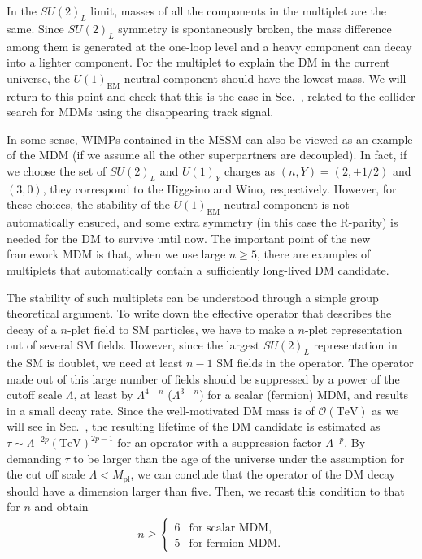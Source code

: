 \documentclass[12pt,twoside,book]{article}
\begin{document}
In the $SU(2)_L$ limit, masses of all the components in the multiplet are the same.
Since $SU(2)_L$ symmetry is spontaneously broken, the mass difference among them is generated at the one-loop level and a heavy component can decay into a lighter component.
For the multiplet to explain the DM in the current universe, the $U(1)_{\mathrm{EM}}$ neutral component should have the lowest mass.
We will return to this point and check that this is the case in Sec.~, related to the collider search for MDMs using the disappearing track signal.

In some sense, WIMPs contained in the MSSM can also be viewed as an example of the MDM (if we assume all the other superpartners are decoupled).
In fact, if we choose the set of $SU(2)_L$ and $U(1)_Y$ charges as $(n,Y) = (2,\pm 1/2)$ and $(3, 0)$, they correspond to the Higgsino and Wino, respectively.
However, for these choices, the stability of the $U(1)_{\mathrm{EM}}$ neutral component is not automatically ensured, and some extra symmetry (in this case the R-parity) is needed for the DM to survive until now.
The important point of the new framework MDM is that, when we use large $n \geq 5$, there are examples of multiplets that automatically contain a sufficiently long-lived DM candidate.

The stability of such multiplets can be understood through a simple group theoretical argument.
To write down the effective operator that describes the decay of a $n$-plet field to SM particles, we have to make a $n$-plet representation out of several SM fields.
However, since the largest $SU(2)_L$ representation in the SM is doublet, we need at least $n-1$ SM fields in the operator.
The operator made out of this large number of fields should be suppressed by a power of the cutoff scale $\Lambda$, at least by $\Lambda^{4-n}$ ($\Lambda^{3-n}$) for a scalar (fermion) MDM, and results in a small decay rate.
Since the well-motivated DM mass is of $\mathcal{O} (\mathrm{TeV})$ as we will see in Sec.~, the resulting lifetime of the DM candidate is estimated as $\tau \sim \Lambda^{-2p} (\mathrm{TeV})^{2p-1}$ for an operator with a suppression factor $\Lambda^{-p}$.
By demanding $\tau$ to be larger than the age of the universe under the assumption for the cut off scale $\Lambda < M_{\mathrm{pl}}$, we can conclude that the operator of the DM decay should have a dimension larger than five.
Then, we recast this condition to that for $n$ and obtain
\begin{align}
  n \geq
  \begin{cases}
    6 & \text{for scalar MDM},\\
    5 & \text{for fermion MDM}.
  \end{cases}
\end{align}
\end{document}
